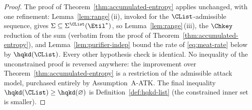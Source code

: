 \begin{proof}
The proof of Theorem~\ref{thm:accumulated-entropy} applies unchanged, with one
refinement: Lemma~\ref{lem:range}\,(ii), invoked for the
$\CList$-admissible sequence, gives
$\Sigma\subseteq\Sigma^{\CList}(\Etil^{*})$, so
Lemma~\ref{lem:range}\,(iii), the $\Chkey$ reduction of the sum (verbatim
from the proof of Theorem~\ref{thm:accumulated-entropy}), and
Lemma~\ref{lem:purifier-indep} bound the rate of \eqref{eq:meat-rate}
below by $\hqkd(\CList)$. Every other hypothesis check is identical.
No inequality of the unconstrained proof is reversed anywhere: the
improvement over Theorem~\ref{thm:accumulated-entropy} is a restriction of
the admissible attack model, purchased entirely by Assumption~A-ATK. The
final inequality $\hqkd(\CList)\ge\hqkd(\varnothing)$ is
Definition~\ref{def:hqkd-list} (the constrained inner set is smaller).
\end{proof}
